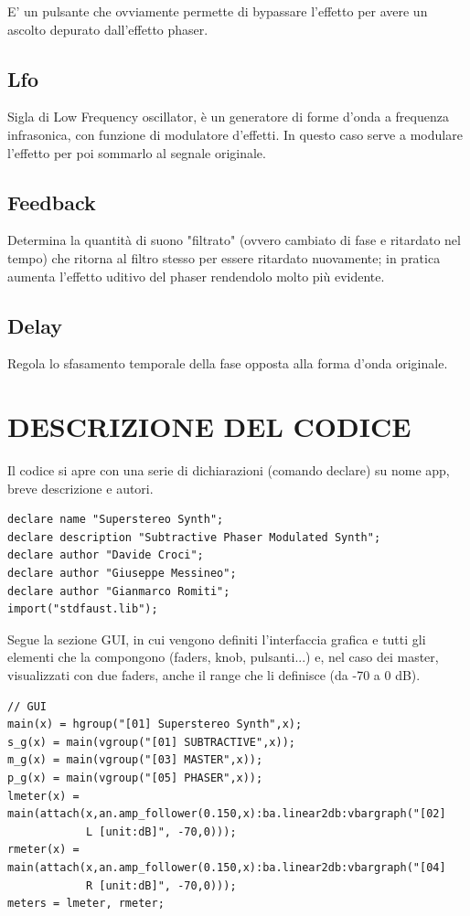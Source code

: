 \documentclass[
	a4paper,
	twocolumn
	]{article}
\begin{document}
E' un pulsante che ovviamente permette di bypassare l'effetto per avere un
ascolto depurato dall'effetto phaser.

\subsection*{Lfo}

Sigla di Low Frequency oscillator, è un generatore di forme d'onda a frequenza
infrasonica, con funzione di modulatore d'effetti. In questo caso serve a
modulare l'effetto per poi sommarlo al segnale originale.

\subsection*{Feedback}

Determina la quantità di suono "filtrato" (ovvero cambiato di fase e
ritardato nel tempo) che ritorna al filtro stesso per essere ritardato
nuovamente; in pratica aumenta l'effetto uditivo del phaser rendendolo
molto più evidente.

\subsection*{Delay}

Regola lo sfasamento temporale della fase opposta alla forma d'onda originale.


\section*{DESCRIZIONE DEL CODICE}

Il codice si apre con una serie di dichiarazioni (comando declare) su nome app,
breve descrizione e autori.

\begin{lstlisting}
declare name "Superstereo Synth";
declare description "Subtractive Phaser Modulated Synth";
declare author "Davide Croci";
declare author "Giuseppe Messineo";
declare author "Gianmarco Romiti";
import("stdfaust.lib");
\end{lstlisting}

Segue la sezione GUI, in cui vengono definiti l'interfaccia grafica e tutti gli
elementi che la compongono (faders, knob, pulsanti...) e, nel caso dei master,
visualizzati con due faders, anche il range che li definisce (da -70 a 0 dB).

\begin{lstlisting}
// GUI
main(x) = hgroup("[01] Superstereo Synth",x);
s_g(x) = main(vgroup("[01] SUBTRACTIVE",x));
m_g(x) = main(vgroup("[03] MASTER",x));
p_g(x) = main(vgroup("[05] PHASER",x));
lmeter(x) = main(attach(x,an.amp_follower(0.150,x):ba.linear2db:vbargraph("[02]
			L [unit:dB]", -70,0)));
rmeter(x) = main(attach(x,an.amp_follower(0.150,x):ba.linear2db:vbargraph("[04]
			R [unit:dB]", -70,0)));
meters = lmeter, rmeter;
\end{lstlisting}
\end{document}
